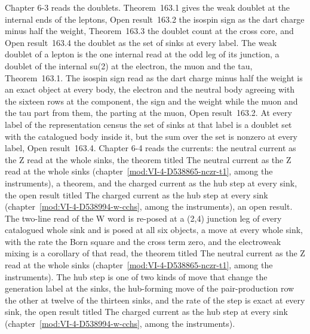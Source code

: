 Chapter 6-3 reads the doublets. Theorem~163.1 gives the weak doublet at the internal ends of the leptons, Open result~163.2 the isospin sign as the dart charge minus half the weight, Theorem~163.3 the doublet count at the cross core, and Open result~163.4 the doublet as the set of sinks at every label. The weak doublet of a lepton is the one internal read at the odd leg of its junction, a doublet of the internal su(2) at the electron, the muon and the tau, Theorem~163.1. The isospin sign read as the dart charge minus half the weight is an exact object at every body, the electron and the neutral body agreeing with the sixteen rows at the component, the sign and the weight while the muon and the tau part from them, the parting at the muon, Open result~163.2. At every label of the representation census the set of sinks at that label is a doublet set with the catalogued body inside it, but the sum over the set is nonzero at every label, Open result~163.4. Chapter 6-4 reads the currents: the neutral current as the Z read at the whole sinks, the theorem titled The neutral current as the Z read at the whole sinks (chapter~\ref{mod:VI-4-D538865-nczr-t1}, among the instruments), a theorem, and the charged current as the hub step at every sink, the open result titled The charged current as the hub step at every sink (chapter~\ref{mod:VI-4-D538994-w-cchs}, among the instruments), an open result. The two-line read of the W word is re-posed at a (2,4) junction leg of every catalogued whole sink and is posed at all six objects, a move at every whole sink, with the rate the Born square and the cross term zero, and the electroweak mixing is a corollary of that read, the theorem titled The neutral current as the Z read at the whole sinks (chapter~\ref{mod:VI-4-D538865-nczr-t1}, among the instruments). The hub step is one of two kinds of move that change the generation label at the sinks, the hub-forming move of the pair-production row the other at twelve of the thirteen sinks, and the rate of the step is exact at every sink, the open result titled The charged current as the hub step at every sink (chapter~\ref{mod:VI-4-D538994-w-cchs}, among the instruments).

